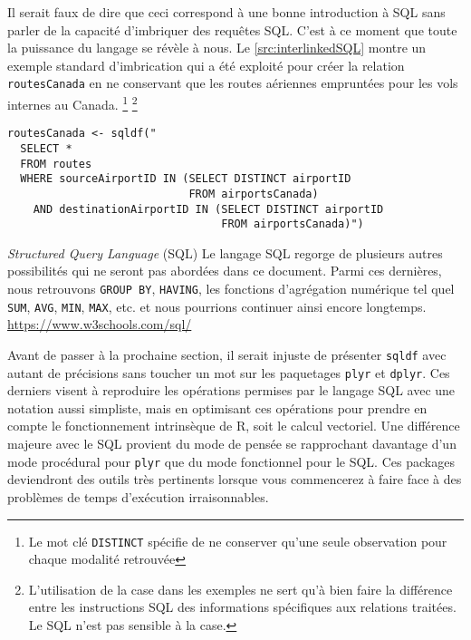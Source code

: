 \vspace{\baselineskip}
Il serait faux de dire que ceci correspond à une bonne introduction à SQL sans parler de la capacité d'imbriquer des requêtes SQL. C'est à ce moment que toute la puissance du langage se révèle à nous. Le \autoref{src:interlinkedSQL} montre un exemple standard d'imbrication qui a été exploité pour créer la relation \texttt{routesCanada} en ne conservant que les routes aériennes empruntées pour les vols internes au Canada. \footnote{Le mot clé \texttt{DISTINCT} spécifie de ne conserver qu'une seule observation pour chaque modalité retrouvée} \footnote{L'utilisation de la case dans les exemples ne sert qu'à bien faire la différence entre les instructions SQL des informations spécifiques aux relations traitées. Le SQL n'est pas sensible à la case.}

\begin{lstlisting}[caption = Fonctionnalités avancées de SQL,label=src:interlinkedSQL]
routesCanada <- sqldf("
  SELECT *
  FROM routes
  WHERE sourceAirportID IN (SELECT DISTINCT airportID
                            FROM airportsCanada)
    AND destinationAirportID IN (SELECT DISTINCT airportID
                                 FROM airportsCanada)")                           
\end{lstlisting}

\begin{moreInfo}{\emph{Structured Query Language} (SQL)}
	Le langage SQL regorge de plusieurs autres possibilités qui ne seront pas abordées dans ce document. Parmi ces dernières, nous retrouvons \texttt{GROUP BY}, \texttt{HAVING}, les fonctions d'agrégation numérique tel quel \texttt{SUM}, \texttt{AVG}, \texttt{MIN}, \texttt{MAX}, etc. et nous pourrions continuer ainsi encore longtemps. \\
	\url{https://www.w3schools.com/sql/}
\end{moreInfo}

Avant de passer à la prochaine section, il serait injuste de présenter \texttt{sqldf} avec autant de précisions sans toucher un mot sur les paquetages \texttt{plyr} et \texttt{dplyr}. Ces derniers visent à reproduire les opérations permises par le langage SQL avec une notation aussi simpliste, mais en optimisant ces opérations pour prendre en compte le fonctionnement intrinsèque de R, soit le calcul vectoriel. Une différence majeure avec le SQL provient du mode de pensée se rapprochant davantage d'un mode procédural pour \texttt{plyr} que du mode fonctionnel pour le SQL. Ces packages deviendront des outils très pertinents lorsque vous commencerez à faire face à des problèmes de temps d'exécution irraisonnables.

